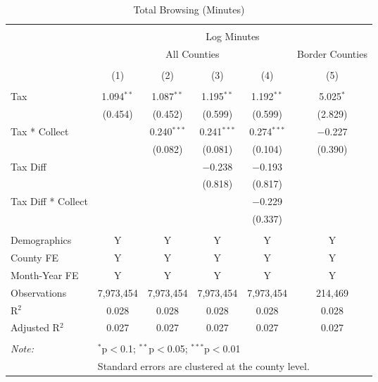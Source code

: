 
\begin{table}[!htbp] \centering 
  \caption{Total Browsing (Minutes)} 
  \label{tab:totalTime} 
\begin{tabular}{@{\extracolsep{5pt}}lccccc} 
\\[-1.8ex]\hline 
\hline \\[-1.8ex] 
 & \multicolumn{5}{c}{Log Minutes} \\ 
\cline{2-6} 
 & \multicolumn{4}{c}{All Counties} & Border Counties \\ 
\\[-1.8ex] & (1) & (2) & (3) & (4) & (5)\\ 
\hline \\[-1.8ex] 
 Tax & 1.094$^{**}$ & 1.087$^{**}$ & 1.195$^{**}$ & 1.192$^{**}$ & 5.025$^{*}$ \\ 
  & (0.454) & (0.452) & (0.599) & (0.599) & (2.829) \\ 
  Tax * Collect &  & 0.240$^{***}$ & 0.241$^{***}$ & 0.274$^{***}$ & $-$0.227 \\ 
  &  & (0.082) & (0.081) & (0.104) & (0.390) \\ 
  Tax Diff &  &  & $-$0.238 & $-$0.193 &  \\ 
  &  &  & (0.818) & (0.817) &  \\ 
  Tax Diff * Collect &  &  &  & $-$0.229 &  \\ 
  &  &  &  & (0.337) &  \\ 
 \hline \\[-1.8ex] 
Demographics & Y & Y & Y & Y & Y \\ 
County FE & Y & Y & Y & Y & Y \\ 
Month-Year FE & Y & Y & Y & Y & Y \\ 
Observations & 7,973,454 & 7,973,454 & 7,973,454 & 7,973,454 & 214,469 \\ 
R$^{2}$ & 0.028 & 0.028 & 0.028 & 0.028 & 0.028 \\ 
Adjusted R$^{2}$ & 0.027 & 0.027 & 0.027 & 0.027 & 0.027 \\ 
\hline 
\hline \\[-1.8ex] 
\textit{Note:}  & \multicolumn{5}{l}{$^{*}$p$<$0.1; $^{**}$p$<$0.05; $^{***}$p$<$0.01} \\ 
 & \multicolumn{5}{l}{Standard errors are clustered at the county level.} \\ 
\end{tabular} 
\end{table} 
